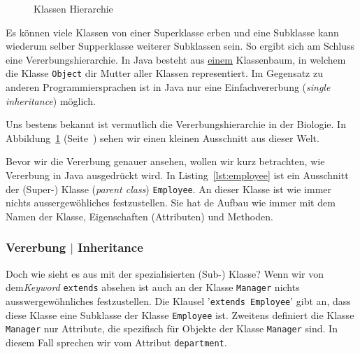 \begin{Exercise}[%
title={Verwalten von Studenten und Kursbelegungen},
label={ex:course}]
\begin{figure}[t]
\begin{center}
\begin{tikzpicture}
        \end{tikzpicture}
    \end{center}
    \caption{Klassen Hierarchie}
    \label{uml:inheritance-hierarchie}
\end{figure}

Es können viele Klassen von einer Superklasse erben und eine Subklasse kann wiederum
selber Supperklasse weiterer Subklassen sein. So ergibt sich am Schluss eine
Vererbungshierarchie. In Java besteht aus \underline{einem} Klassenbaum, in welchem
die Klasse \texttt{Object} dir Mutter aller Klassen representiert. Im Gegensatz zu
anderen Programmiersprachen ist in Java nur eine Einfachvererbung (\emph{single
inheritance}) möglich.

Uns bestens bekannt ist vermutlich die Vererbungshierarchie in der Biologie. In
Abbildung~\ref{uml:inheritance-hierarchie} (Seite~\pageref{uml:inheritance-hierarchie})
sehen wir einen kleinen Ausschnitt aus dieser Welt.

Bevor wir die Vererbung genauer ansehen, wollen wir kurz betrachten, wie Vererbung in Java
ausgedrückt wird. In Listing~\ref{lst:employee} ist ein Ausschnitt der (Super-) Klasse
(\emph{parent class}) \texttt{Employee}. An dieser Klasse ist wie immer nichts aussergewöhliches
festzustellen. Sie hat de Aufbau wie immer mit dem Namen der Klasse, Eigenschaften (Attributen)
und Methoden.

\begin{frame}[fragile]
    \frametitle<presentation>{Vererbung $|$ Inheritance}
\end{frame}



Doch wie sieht es aus mit der spezialisierten (Sub-) Klasse? Wenn wir von dem\emph{Keyword}
\texttt{extends} absehen ist auch an der Klasse \texttt{Manager} nichts
ausswergewöhnliches festzustellen. Die Klausel '\texttt{extends Employee}' gibt an,
dass diese Klasse eine Subklasse der Klasse \texttt{Employee} ist. Zweitens definiert
die Klasse \texttt{Manager} nur Attribute, die spezifisch für Objekte der Klasse
\texttt{Manager} sind. In diesem Fall sprechen wir vom Attribut \texttt{department}.


\end{Exercise}
